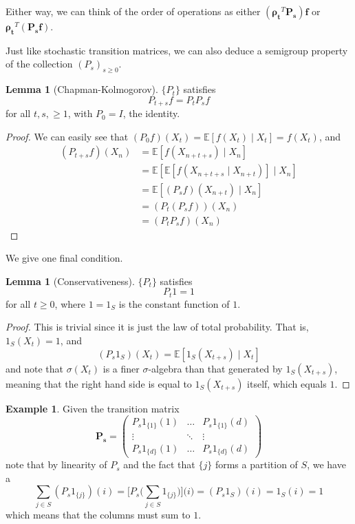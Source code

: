 \documentclass{article}
\theoremstyle{definition}
\newtheorem{lemma}[theorem]{Lemma}
\newtheorem{example}{Example}[section]
\theoremstyle{remark}
\theoremstyle{definition}
\begin{document}
  Either way, we can think of the order of operations as either $(\boldsymbol{\rho_t}^T \mathbf{P_s}) \mathbf{f}$ or $\boldsymbol{\rho_t}^T (\mathbf{P_s} \mathbf{f})$. 

  Just like stochastic transition matrices, we can also deduce a semigroup property of the collection $(P_s)_{s \geq 0}$. 

  \begin{lemma}[Chapman-Kolmogorov]
  $\{P_t\}$ satisfies 
  \[P_{t + s} f = P_t P_s f\]
  for all $t, s, \geq 1$, with $P_0 = I$, the identity. 
  \end{lemma}
  \begin{proof}
  We can easily see that $(P_0 f) (X_t) = \mathbb{E}[f(X_t) \mid X_t] = f(X_t)$, and 
  \begin{align*}
      (P_{t + s} f) (X_n) & = \mathbb{E}[ f(X_{n + t + s}) \mid X_n] \\
      & = \mathbb{E} [ \mathbb{E}[ f(X_{n + t + s} \mid X_{n + t}) ] \mid X_n] \\
      & = \mathbb{E}[(P_s f) (X_{n + t}) \mid X_n] \\
      & = (P_t (P_s f))(X_n) \\
      & = (P_t P_s f) (X_n)
  \end{align*}
  \end{proof}

  We give one final condition. 

  \begin{lemma}[Conservativeness]
  $\{P_t\}$ satisfies 
  \[P_t 1 = 1\]
  for all $t \geq 0$, where $1 = 1_S$ is the constant function of $1$. 
  \end{lemma}
  \begin{proof}
  This is trivial since it is just the law of total probability. That is, $1_S (X_t) = 1$, and 
  \[(P_s 1_S) (X_t) = \mathbb{E}[ 1_S (X_{t + s}) \mid X_t]\]
  and note that $\sigma(X_t)$ is a finer $\sigma$-algebra than that generated by $1_S (X_{t + s})$, meaning that the right hand side is equal to $1_S (X_{t + s})$ itself, which equals $1$. 
  \end{proof}

  \begin{example}
  Given the transition matrix 
  \[\mathbf{P_s} = \begin{pmatrix} P_s 1_{\{1\}} (1) & \ldots & P_s 1_{\{1\}} (d) \\ \vdots & \ddots & \vdots \\ P_s 1_{\{d\}} (1) & \ldots & P_s 1_{\{d\}} (d) \end{pmatrix}\]
  note that by linearity of $P_s$ and the fact that $\{j\}$ forms a partition of $S$, we have a
  \[\sum_{j \in S} (P_s 1_{\{j\}}) (i) = \bigg[ P_s \bigg( \sum_{j \in S} 1_{\{j\}} \bigg) \bigg] \big( i \big) = (P_s 1_S) (i) = 1_S (i) = 1\]
  which means that the columns must sum to $1$. 
  \end{example}
\end{document}
